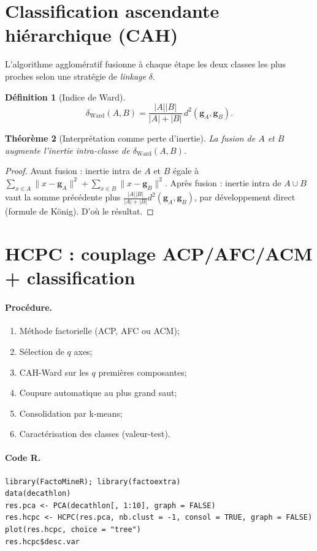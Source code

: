 \documentclass[11pt, a4paper, openany]{book}
\theoremstyle{plain}
\newtheorem{theorem}{Théorème}[chapter]
\theoremstyle{definition}
\newtheorem{definition}[theorem]{Définition}
\theoremstyle{remark}
\newcommand{\1}{\mathds{1}}
\begin{document}
\section{Classification ascendante hiérarchique (CAH)}

L'algorithme agglomératif fusionne à chaque étape les deux classes les plus
proches selon une stratégie de \textit{linkage} $\delta$.

\begin{definition}[Indice de Ward]
\[
\delta_{\text{Ward}}(A, B) = \frac{|A| |B|}{|A| + |B|}\, d^2(\mathbf{g}_A, \mathbf{g}_B).
\]
\end{definition}

\begin{theorem}[Interprétation comme perte d'inertie]
La fusion de $A$ et $B$ augmente l'inertie intra-classe de
$\delta_{\text{Ward}}(A, B)$.
\end{theorem}

\begin{proof}
Avant fusion : inertie intra de $A$ et $B$ égale à $\sum_{x \in A} \|x - \mathbf{g}_A\|^2 + \sum_{x \in B} \|x - \mathbf{g}_B\|^2$.
Après fusion : inertie intra de $A \cup B$ vaut la somme précédente plus
$\frac{|A| |B|}{|A| + |B|} d^2(\mathbf{g}_A, \mathbf{g}_B)$, par développement direct
(formule de König). D'où le résultat.
\end{proof}

\section{HCPC : couplage ACP/AFC/ACM + classification}

\paragraph{Procédure.}
\begin{enumerate}
  \item Méthode factorielle (ACP, AFC ou ACM);
  \item Sélection de $q$ axes;
  \item CAH-Ward sur les $q$ premières composantes;
  \item Coupure automatique au plus grand saut;
  \item Consolidation par k-means;
  \item Caractérisation des classes (valeur-test).
\end{enumerate}

\paragraph{Code R.}
\begin{lstlisting}
library(FactoMineR); library(factoextra)
data(decathlon)
res.pca <- PCA(decathlon[, 1:10], graph = FALSE)
res.hcpc <- HCPC(res.pca, nb.clust = -1, consol = TRUE, graph = FALSE)
plot(res.hcpc, choice = "tree")
res.hcpc$desc.var
\end{lstlisting}
\end{document}
